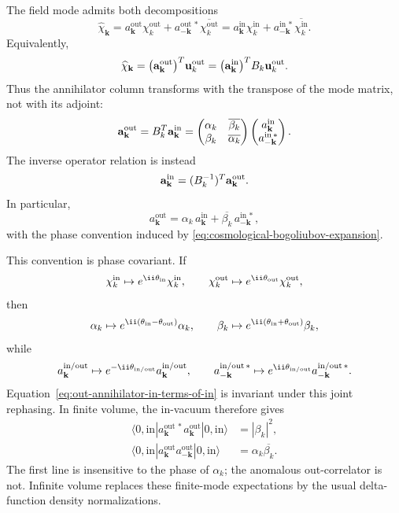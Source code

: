 The field mode admits both decompositions
\[
  \widehat\chi_{\mathbf k}
  =
  a_{\mathbf k}^{\mathrm{out}}\chi_k^{\mathrm{out}}
  +
  a_{-\mathbf k}^{\mathrm{out}\,*}\overline{\chi_k^{\mathrm{out}}}
  =
  a_{\mathbf k}^{\mathrm{in}}\chi_k^{\mathrm{in}}
  +
  a_{-\mathbf k}^{\mathrm{in}\,*}\overline{\chi_k^{\mathrm{in}}}.
\]
Equivalently,
\[
  \widehat\chi_{\mathbf k}
  =
  \bigl(\mathbf a_{\mathbf k}^{\rm out}\bigr)^T
  \mathbf u_k^{\rm out}
  =
  \bigl(\mathbf a_{\mathbf k}^{\rm in}\bigr)^T
  B_k\mathbf u_k^{\rm out}.
\]
Thus the annihilator column transforms with the transpose of the mode matrix,
not with its adjoint:
\begin{equation}
  \mathbf a_{\mathbf k}^{\rm out}
  =
  B_k^T\mathbf a_{\mathbf k}^{\rm in}
  =
  \begin{pmatrix}
    \alpha_k&\overline{\beta_k}\\
    \beta_k&\overline{\alpha_k}
  \end{pmatrix}
  \begin{pmatrix}
    a_{\mathbf k}^{\rm in}\\
    a_{-\mathbf k}^{\rm in\,*}
  \end{pmatrix}.
  \label{eq:cosmological-annihilator-matrix}
\end{equation}
The inverse operator relation is instead
\[
  \mathbf a_{\mathbf k}^{\rm in}
  =
  (B_k^{-1})^T\mathbf a_{\mathbf k}^{\rm out}.
\]
In particular,
\begin{equation}
  a_{\mathbf k}^{\mathrm{out}}
  =
  \alpha_k\,a_{\mathbf k}^{\mathrm{in}}
  +
  \overline{\beta_k}\,a_{-\mathbf k}^{\mathrm{in}\,*},
  \label{eq:out-annihilator-in-terms-of-in}
\end{equation}
with the phase convention induced by
\eqref{eq:cosmological-bogoliubov-expansion}.

This convention is phase covariant.  If
\[
  \chi_k^{\rm in}\mapsto e^{\ii\theta_{\rm in}}\chi_k^{\rm in},
  \qquad
  \chi_k^{\rm out}\mapsto e^{\ii\theta_{\rm out}}\chi_k^{\rm out},
\]
then
\[
  \alpha_k\mapsto
  e^{\ii(\theta_{\rm in}-\theta_{\rm out})}\alpha_k,
  \qquad
  \beta_k\mapsto
  e^{\ii(\theta_{\rm in}+\theta_{\rm out})}\beta_k,
\]
while
\[
  a_{\mathbf k}^{\rm in/out}\mapsto
  e^{-\ii\theta_{\rm in/out}}a_{\mathbf k}^{\rm in/out},
  \qquad
  a_{-\mathbf k}^{\rm in/out\,*}\mapsto
  e^{\ii\theta_{\rm in/out}}a_{-\mathbf k}^{\rm in/out\,*}.
\]
Equation~\eqref{eq:out-annihilator-in-terms-of-in} is invariant under this
joint rephasing.  In finite volume, the in-vacuum therefore gives
\begin{align}
  \langle0,\mathrm{in}|
  a_{\mathbf k}^{\mathrm{out}\,*}a_{\mathbf k}^{\mathrm{out}}
  |0,\mathrm{in}\rangle
  &=
  |\beta_k|^2,
  \label{eq:cosmological-particle-number}\\
  \langle0,\mathrm{in}|
  a_{\mathbf k}^{\mathrm{out}}a_{-\mathbf k}^{\mathrm{out}}
  |0,\mathrm{in}\rangle
  &=
  \alpha_k\overline{\beta_k}.
  \label{eq:cosmological-anomalous-out-correlator}
\end{align}
The first line is insensitive to the phase of \(\alpha_k\); the anomalous
out-correlator is not.  Infinite volume replaces these finite-mode
expectations by the usual delta-function density normalizations.

